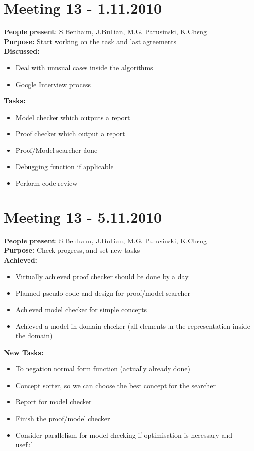 \documentclass[12pt,a4paper]{article}
\begin{document}
\section*{Meeting 13 - 1.11.2010}

\textbf{People present:} S.Benhaim, J.Bullian, M.G. Parusinski, K.Cheng \\
\textbf{Purpose:} Start working on the task and last agreements \\
\textbf{Discussed:}
\begin{itemize}
\item Deal with unusual cases inside the algorithms
\item Google Interview process
\end{itemize}
\textbf{Tasks:}
\begin{itemize}
\item Model checker which outputs a report
\item Proof checker which output a report
\item Proof/Model searcher done
\item Debugging function if applicable
\item Perform code review
\end{itemize}

\section*{Meeting 13 - 5.11.2010}

\textbf{People present:} S.Benhaim, J.Bullian, M.G. Parusinski, K.Cheng \\
\textbf{Purpose:} Check progress, and set new tasks \\
\textbf{Achieved:}
\begin{itemize}
\item Virtually achieved proof checker should be done by a day
\item Planned pseudo-code and design for proof/model searcher
\item Achieved model checker for simple concepts
\item Achieved a model in domain checker (all elements in the representation inside the domain)
\end{itemize}
\textbf{New Tasks:}
\begin{itemize}
\item To negation normal form function (actually already done)
\item Concept sorter, so we can choose the best concept for the searcher
\item Report for model checker
\item Finish the proof/model checker
\item Consider parallelism for model checking if optimisation is necessary and useful
\end{itemize}
\end{document}
